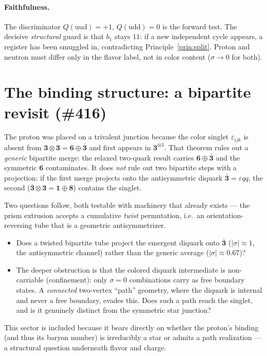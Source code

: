 \documentclass[11pt]{article}
\theoremstyle{definition}
\newcommand{\rep}[1]{\mathbf{#1}}
\newcommand{\triv}{\mathbf{1}}
\newcommand{\abs}[1]{\left\lvert #1 \right\rvert}
\newcommand{\sigmacol}{\sigma}
\begin{document}
\paragraph{Faithfulness.} The discriminator $Q(\text{uud})=+1$, $Q(\text{udd})=0$ is the
forward test. The decisive \emph{structural} guard is that $b_1$ stays $11$: if a new
independent cycle appears, a register has been smuggled in, contradicting
Principle~\ref{prin:split}. Proton and neutron must differ only in the flavor label, not
in color content ($\sigmacol\to0$ for both).

\section{The binding structure: a bipartite revisit (\#416)}
\label{sec:bipartite}

The proton was placed on a trivalent junction because the color singlet
$\varepsilon_{ijk}$ is absent from $\rep3\otimes\rep3=\rep6\oplus\bar{\rep3}$ and first
appears in $\rep3^{\otimes3}$. That theorem rules out a \emph{generic} bipartite merge:
the relaxed two-quark result carries $\rep6\oplus\bar{\rep3}$ and the symmetric $\rep6$
contaminates. It does \emph{not} rule out two bipartite steps with a projection: if the
first merge projects onto the antisymmetric diquark $\bar{\rep3}=\varepsilon q q$, the
second ($\bar{\rep3}\otimes\rep3=\triv\oplus\rep8$) contains the singlet.

Two questions follow, both testable with machinery that already exists --- the prism
extrusion accepts a cumulative \emph{twist} permutation, i.e.\ an orientation-reversing
tube that is a geometric antisymmetrizer.
\begin{itemize}[nosep]
  \item Does a twisted bipartite tube project the emergent diquark onto $\bar{\rep3}$
  ($\abs{\sigmacol}\approx1$, the antisymmetric channel) rather than the generic average
  ($\abs{\sigmacol}\approx0.67$)?
  \item The deeper obstruction is that the colored diquark intermediate is non-carriable
  (confinement): only $\sigmacol=0$ combinations carry as free boundary states. A
  \emph{connected} two-vertex ``path'' geometry, where the diquark is internal and never
  a free boundary, evades this. Does such a path reach the singlet, and is it genuinely
  distinct from the symmetric star junction?
\end{itemize}
This sector is included because it bears directly on whether the proton's binding (and
thus its baryon number) is irreducibly a star or admits a path realization --- a
structural question underneath flavor and charge.
\end{document}
